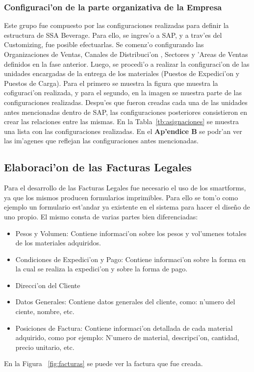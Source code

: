 \subsubsection{Configuraci'on de la parte organizativa de la Empresa}
	Este grupo fue compuesto por las configuraciones realizadas para definir la estructura de SSA Beverage. Para ello, se ingres'o a SAP, y a trav'es del Customizing, fue posible efectuarlas. Se comenz'o configurando las Organizaciones de Ventas, Canales de Distribuci'on , Sectores y 'Areas de Ventas definidos en la fase anterior.
\newline
\newline
	Luego, se procedi'o a realizar la configuraci'on de las unidades encargadas de la entrega de los materiales (Puestos de Expedici'on y Puestos de Carga). Para el primero se muestra la figura que muestra la cofiguraci'on realizada, y para el segundo, en la imagen se muestra parte de las configuraciones realizadas.
\newline
\newline
Despu'es que fueron creadas cada una de las unidades antes mencionadas dentro de SAP, las configuraciones posteriores consistieron en crear las relaciones entre las mismas. En la Tabla~\ref{tb:asignaciones} se muestra una lista con las configuraciones realizadas.
\newline
\newline
En el \textbf{Ap'endice  B} se podr'an ver las im'agenes que reflejan las configuraciones antes mencionadas.
\subsection{Elaboraci'on de las Facturas Legales}
	Para el desarrollo de las Facturas Legales fue necesario el uso de los smartforms, ya que los mismos producen formularios imprimibles. Para ello se tom'o como ejemplo un formulario est'andar ya existente en el sistema para hacer el dise\~no de uno propio. El mismo consta de varias partes bien diferenciadas:
\begin{itemize}
\item Pesos y Volumen: Contiene informaci'on sobre los pesos y vol'umenes totales de los materiales adquiridos.
\item Condiciones de Expedici'on y Pago: Contiene informaci'on sobre la forma en la cual se realiza la expedici'on y sobre la forma de pago.
\item Direcci'on del Cliente
\item Datos Generales: Contiene datos generales del cliente, como: n'umero del ciente, nombre, etc.
\item Posiciones de Factura: Contiene informaci'on detallada de cada material adquirido, como por ejemplo: N'umero de material, descripci'on, cantidad, precio unitario, etc.
\end{itemize}
	En la Figura  ~\ref{fig:facturas} se puede ver la factura que fue creada.


